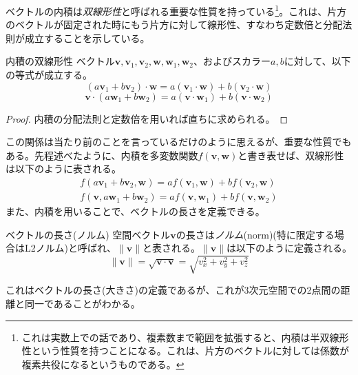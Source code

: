 ベクトルの内積は\emph{双線形性}と呼ばれる重要な性質を持っている\footnote{これは実数上での話であり、複素数まで範囲を拡張すると、内積は半双線形性という性質を持つことになる。これは、片方のベクトルに対しては係数が複素共役になるというものである。}。これは、片方のベクトルが固定された時にもう片方に対して線形性、すなわち定数倍と分配法則が成立することを示している。
\begin{theorem*}{内積の双線形性}
	ベクトル\(\boldsymbol{v},\boldsymbol{v}_1,\boldsymbol{v}_2,\boldsymbol{w},\boldsymbol{w}_1,\boldsymbol{w}_2\)、およびスカラー\(a,b\)に対して、以下の等式が成立する。
	\begin{equation}
		(a\boldsymbol{v}_1+b\boldsymbol{v}_2)\cdot\boldsymbol{w}= a (\boldsymbol{v}_1\cdot \boldsymbol{w}) + b (\boldsymbol{v}_2\cdot \boldsymbol{w})
	\end{equation}
	\begin{equation}
		\boldsymbol{v}\cdot(a\boldsymbol{w}_1+b\boldsymbol{w}_2)= a (\boldsymbol{v}\cdot \boldsymbol{w}_1) + b (\boldsymbol{v}\cdot \boldsymbol{w}_2)
	\end{equation}
\end{theorem*}
\begin{proof}
	内積の分配法則と定数倍を用いれば直ちに求められる。
\end{proof}
この関係は当たり前のことを言っているだけのように思えるが、重要な性質でもある。先程述べたように、内積を多変数関数\(f(\boldsymbol{v},\boldsymbol{w})\)と書き表せば、双線形性は以下のように表される。
\begin{equation}
	\begin{aligned}
		f(a\boldsymbol{v}_1+b\boldsymbol{v}_2,\boldsymbol{w})= a f(\boldsymbol{v}_1,\boldsymbol{w}) + b f(\boldsymbol{v}_2, \boldsymbol{w}) \\
		f(\boldsymbol{v},a\boldsymbol{w}_1+b\boldsymbol{w}_2)= a f(\boldsymbol{v},\boldsymbol{w}_1) + b f(\boldsymbol{v}, \boldsymbol{w}_2)
	\end{aligned}
\end{equation}
また、内積を用いることで、ベクトルの長さを定義できる。
\begin{definition*}{ベクトルの長さ(ノルム)}
	空間ベクトル\(\boldsymbol{v}\)の長さは\emph{ノルム}(norm)(特に限定する場合はL2ノルム)と呼ばれ、\(\|\boldsymbol{v}\|\)と表される。\(\|\boldsymbol{v}\|\)は以下のように定義される。
	\begin{equation}
		\|\boldsymbol{v}\|=\sqrt{\boldsymbol{v}\cdot\boldsymbol{v}}= \sqrt{v_x^2+v_y^2+ v_z^2}
	\end{equation}
\end{definition*}
これはベクトルの長さ(大きさ)の定義であるが、これが3次元空間での2点間の距離と同一であることがわかる。
